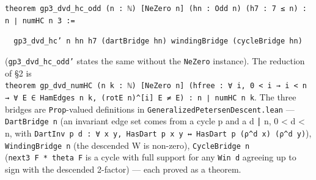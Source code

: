 \documentclass[11pt,a4paper]{article}
\theoremstyle{named}
\begin{document}
\begin{leancode}
\item \texttt{theorem\ \allowbreak{}gp3\_\allowbreak{}dvd\_\allowbreak{}hc\_\allowbreak{}odd\ \allowbreak{}(n\ \allowbreak{}:\ \allowbreak{}ℕ)\ \allowbreak{}[NeZero\ \allowbreak{}n]\ \allowbreak{}(hn\ \allowbreak{}:\ \allowbreak{}Odd\ \allowbreak{}n)\ \allowbreak{}(h7\ \allowbreak{}:\ \allowbreak{}7\ \allowbreak{}≤\ \allowbreak{}n)\ \allowbreak{}:\ \allowbreak{}n\ \allowbreak{}∣\ \allowbreak{}numHC\ \allowbreak{}n\ \allowbreak{}3\ \allowbreak{}:=}
\item \texttt{\ \allowbreak{}\ \allowbreak{}gp3\_\allowbreak{}dvd\_\allowbreak{}hc'\ \allowbreak{}n\ \allowbreak{}hn\ \allowbreak{}h7\ \allowbreak{}(dartBridge\ \allowbreak{}hn)\ \allowbreak{}windingBridge\ \allowbreak{}(cycleBridge\ \allowbreak{}hn)}
\end{leancode}
(\texttt{gp3\_\allowbreak{}dvd\_\allowbreak{}hc\_\allowbreak{}odd'} states the same without the \texttt{NeZero} instance). The reduction of §2 is \texttt{theorem\ \allowbreak{}gp\_\allowbreak{}dvd\_\allowbreak{}numHC\ \allowbreak{}(n\ \allowbreak{}k\ \allowbreak{}:\ \allowbreak{}ℕ)\ \allowbreak{}[NeZero\ \allowbreak{}n]\ \allowbreak{}(hfree\ \allowbreak{}:\ \allowbreak{}∀\ \allowbreak{}i,\ \allowbreak{}0\ \allowbreak{}\textless{}\ \allowbreak{}i\ \allowbreak{}→\ \allowbreak{}i\ \allowbreak{}\textless{}\ \allowbreak{}n\ \allowbreak{}→\ \allowbreak{}∀\ \allowbreak{}E\ \allowbreak{}∈\ \allowbreak{}HamEdges\ \allowbreak{}n\ \allowbreak{}k,\ \allowbreak{}(rotE\ \allowbreak{}n)\textasciicircum{}[i]\ \allowbreak{}E\ \allowbreak{}≠\ \allowbreak{}E)\ \allowbreak{}:\ \allowbreak{}n\ \allowbreak{}∣\ \allowbreak{}numHC\ \allowbreak{}n\ \allowbreak{}k}. The three bridges are \texttt{Prop}-valued definitions in \texttt{GeneralizedPetersenDescent.\allowbreak{}lean} — \texttt{DartBridge\ \allowbreak{}n} (an invariant edge set comes from a cycle p and a d ∣ n, 0 \textless{} d \textless{} n, with \texttt{DartInv\ \allowbreak{}p\ \allowbreak{}d\ \allowbreak{}:\ \allowbreak{}∀\ \allowbreak{}x\ \allowbreak{}y,\ \allowbreak{}HasDart\ \allowbreak{}p\ \allowbreak{}x\ \allowbreak{}y\ \allowbreak{}↔\ \allowbreak{}HasDart\ \allowbreak{}p\ \allowbreak{}(ρ\textasciicircum{}d\ \allowbreak{}x)\ \allowbreak{}(ρ\textasciicircum{}d\ \allowbreak{}y)}), \texttt{WindingBridge\ \allowbreak{}n} (the descended W is non-zero), \texttt{CycleBridge\ \allowbreak{}n} (\texttt{next3\ \allowbreak{}F\ \allowbreak{}*\ \allowbreak{}theta\ \allowbreak{}F} is a cycle with full support for any \texttt{Win\ \allowbreak{}d} agreeing up to sign with the descended 2-factor) — each proved as a theorem.
\end{document}
